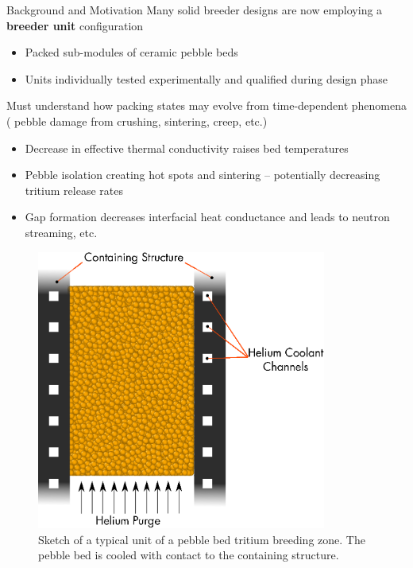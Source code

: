 
\begin{frame}{Background and Motivation}
Many solid breeder designs are now employing a \textbf{breeder unit} configuration
\begin{itemize}
	\item Packed sub-modules of ceramic pebble beds
	\item Units individually tested experimentally and qualified during design phase
\end{itemize}

Must understand how packing states may evolve from time-dependent phenomena ( pebble damage from crushing, sintering, creep, etc.)
\begin{itemize}
	\item Decrease in effective thermal conductivity raises bed temperatures
	\item Pebble isolation creating hot spots and sintering -- potentially decreasing tritium release rates
\item Gap formation decreases interfacial heat conductance and leads to neutron streaming, etc.
\end{itemize}

\end{frame}

\begin{frame}
\begin{figure}
	\centering
	\includegraphics[width=0.85\textwidth]{chapters/figures/solid_breeder_sketch} 
	\caption{Sketch of a typical unit of a pebble bed tritium breeding zone. The pebble bed is cooled with contact to the containing structure.}
	\label{fig:solid-breeder-sketch}
\end{figure}
\end{frame}